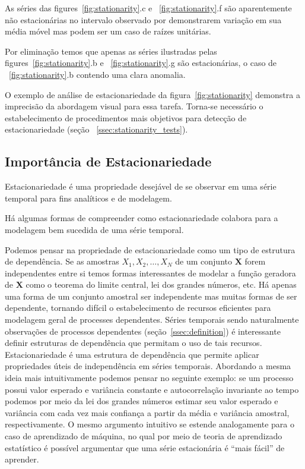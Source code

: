 As séries das figures~\ref{fig:stationarity}.c e ~\ref{fig:stationarity}.f são
aparentemente não estacionárias no intervalo observado por demonstrarem
variação em sua média móvel mas podem ser um caso de raízes unitárias.

Por eliminação temos que apenas as séries ilustradas pelas
figures~\ref{fig:stationarity}.b e ~\ref{fig:stationarity}.g são estacionárias,
o caso de ~\ref{fig:stationarity}.b contendo uma clara anomalia.

O exemplo de análise de estacionariedade da figura~\ref{fig:stationarity}
demonstra a imprecisão da abordagem visual para essa tarefa. Torna-se
necessário o estabelecimento de procedimentos mais objetivos para detecção de
estacionariedade (seção ~\ref{ssec:stationarity_tests}).

\subsection{Importância de Estacionariedade}

Estacionariedade é uma propriedade desejável de se observar em uma série
temporal para fins analíticos e de modelagem.

Há algumas formas de compreender como estacionariedade colabora para a
modelagem bem sucedida de uma série temporal.

Podemos pensar na propriedade de estacionariedade como um tipo de estrutura de
dependência. Se as amostras $X_1, X_2, \dots, X_N$ de um conjunto $\mathbf{X}$
forem independentes entre si temos formas interessantes de modelar a função
geradora de $\mathbf{X}$ como o teorema do limite central, lei dos grandes
números, etc. Há apenas uma forma de um conjunto amostral ser independente mas
muitas formas de ser dependente, tornando difícil o estabelecimento de recursos
eficientes para modelagem geral de processes dependentes. Séries temporais
sendo naturalmente observações de processos dependentes
(seção~\ref{ssec:definition}) é interessante definir estruturas de dependência
que permitam o uso de tais recursos. Estacionariedade é uma estrutura de
dependência que permite aplicar propriedades úteis de independência em séries
temporais. Abordando a mesma ideia mais intuitivamente podemos pensar no
seguinte exemplo: se um processo possui valor esperado e variância constante e
autocorrelação invariante ao tempo podemos por meio da lei dos grandes números
estimar seu valor esperado e variância com cada vez mais confiança a partir da
média e variância amostral, respectivamente. O mesmo argumento intuitivo se
estende
analogamente para o caso de aprendizado de máquina, no qual por meio de teoria
de aprendizado estatístico é possível argumentar que uma série estacionária é
``mais fácil'' de aprender.

